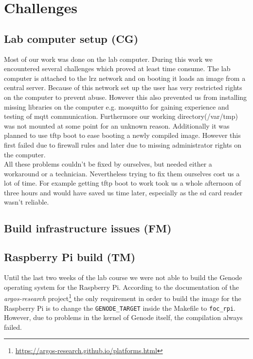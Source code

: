 \section{Challenges}
\label{sec:challenges}


\subsection{Lab computer setup (CG)}
Most of our work was done on the lab computer. During this work we encountered several challenges which proved at least time consume. The lab computer is attached to the lrz network and on booting it loads an image from a central server. Because of this network set up the user has very restricted rights on the computer to prevent abuse. However this also prevented us from installing missing libraries on the computer e.g. mosquitto for gaining experience and testing of mqtt communication. Furthermore our working directory(/var/tmp) was not mounted at some point for an unknown reason.
Additionally it was planned to use tftp boot to ease booting a newly compiled image. However this first failed due to firewall rules and later due to missing administrator rights on the computer.\\

All these problems couldn't be fixed by ourselves, but needed either a workaround or a technician. Nevertheless trying to fix them ourselves cost us a lot of time. For example getting tftp boot to work took us a whole afternoon of three hours and would have saved us time later, especially as the sd card reader wasn't reliable.

\subsection{Build infrastructure issues (FM)}


\subsection{Raspberry Pi build (TM)}
\label{sec:pi-problems}
Until the last two weeks of the lab course we were not able to build the Genode operating system for the Raspberry Pi. According to the documentation of the \textit{argos-research} project\footnote{\url{https://argos-research.github.io/platforms.html}} the only requirement in order to build the image for the Raspberry Pi is to change the \texttt{GENODE\_TARGET} inside the Makefile to \texttt{foc\_rpi}. However, due to problems in the kernel of Genode itself, the compilation always failed. \\

